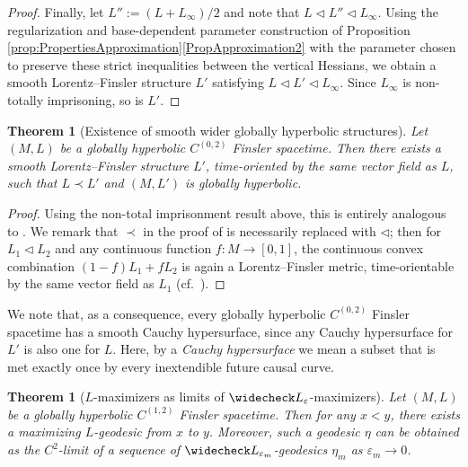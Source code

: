 \documentclass[a4paper,11pt]{article}
\numberwithin{equation}{section}
\theoremstyle{definition}
\theoremstyle{plain}
\newtheorem{Theorem}[Definition]{Theorem}
\newcommand{\eps}{\varepsilon}
\begin{document}
\begin{proof}
    Finally, let $L'':=(L+L_\infty)/2$ and note that $L \triangleleft L'' \triangleleft L_\infty$.
    Using the regularization and base-dependent parameter construction of Proposition \ref{prop:PropertiesApproximation}\ref{PropApproximation2} with the parameter chosen to preserve these strict inequalities between the vertical Hessians, we obtain a smooth Lorentz–Finsler structure $L'$ satisfying $L \triangleleft L' \triangleleft L_\infty$. Since $L_\infty$ is non-totally imprisoning, so is $L'$.
\end{proof}

\begin{Theorem}[Existence of smooth wider globally hyperbolic structures]\label{th:gh-stab}
    Let $(M,L)$ be a globally hyperbolic $C^{(0,2)}$ Finsler spacetime. 
    Then there exists a smooth Lorentz--Finsler structure $L'$, time-oriented by the same vector field as $L$, such that $L \prec L'$ and $(M,L')$ is globally hyperbolic.
\end{Theorem}

\begin{proof}
    Using the non-total imprisonment result above, this is entirely analogous to \cite[Thm.\ 4.5]{Saemann}.
    We remark that $\prec$ in the proof of \cite[Thm.\ 4.5]{Saemann} is necessarily replaced with $\triangleleft$; then for $L_1 \triangleleft L_2$ and any continuous function $f:M \to [0,1]$, the continuous convex combination $(1-f)L_1 +fL_2$ is again a Lorentz--Finsler metric, time-orientable by the same vector field as $L_1$ (cf.\ \cite[Lem.\ 4.1]{Saemann}).
\end{proof}

We note that, as a consequence, every globally hyperbolic $C^{(0,2)}$ Finsler spacetime has a smooth Cauchy hypersurface, since any Cauchy hypersurface for $L'$ is also one for $L$. 
Here, by a \emph{Cauchy hypersurface} we mean a subset that is met exactly once by every inextendible future causal curve.

\begin{Theorem}[$L$-maximizers as limits of $\widecheck L_\varepsilon$-maximizers]
Let $(M,L)$ be a globally hyperbolic $C^{(1,2)}$ Finsler spacetime. 
Then for any $x < y$, there exists a maximizing $L$-geodesic from $x$ to $y$. 
Moreover, such a geodesic $\eta$ can be obtained as the $C^2$-limit of a sequence of $\widecheck L_{\varepsilon_m}$-geodesics $\eta_m$ as $\eps_m \to 0$.
\end{Theorem}
\end{document}
